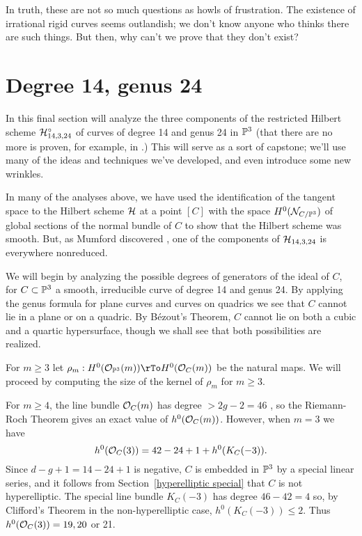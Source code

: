 In truth, these are not so much questions as howls of frustration. The existence of irrational rigid curves seems outlandish; we don't know anyone who thinks there are such things. But then, why can't we prove that they don't exist?



\section{Degree 14, genus 24}\label{mumford example}

In this final section will analyze the three components of the restricted Hilbert scheme $\cH^\circ_{14,3,24}$ of curves of degree 14 and genus 24 in $\PP^3$ (that there are no more is proven, for example, in \cite{Nasu2008}.) This will serve as a sort of capstone; we'll use many of the ideas and techniques we've developed, and even introduce some new wrinkles. 

In many of the analyses above, we have used the identification of the tangent space to the Hilbert scheme $\cH$ at a point $[C]$ with the space $H^0(\cN_{C/\PP^3})$ of global sections of the normal bundle of $C$ to show that the Hilbert scheme was smooth. But, as Mumford discovered \cite{Mumford1962}, one of the components of $\cH_{14,3,24}$  is everywhere nonreduced.

We will begin by analyzing the possible degrees of generators of the ideal of $C$, for $C \subset \PP^3$ a smooth, irreducible curve of degree 14 and genus 24. By applying the genus formula for plane curves and curves on quadrics we see that $C$ cannot lie in a plane or on a quadric. By B\'ezout's Theorem, $C$ cannot lie on both a cubic and a quartic hypersurface, though we shall see that both possibilities are realized.

For $m\geq 3$ let
$
\rho_m : H^0(\cO_{\PP^3}(m)) \rTo H^0(\cO_C(m))
$
be the natural maps.
We will proceed by computing the size of the kernel of $\rho_m$ for $m\geq 3$.

For $m \geq 4$, the line bundle $\cO_C(m)$ has degree $>2g-2 = 46$ , so the Riemann-Roch Theorem gives an exact value of $h^0(\cO_C(m))$.
However, when $m= 3$ we have 
$$
h^0(\cO_C(3)) = 42-24+1+h^0(K_C(-3)).
$$
Since $d-g+1 = 14-24+1$ is negative, $C$ is embedded in $\PP^3$ by a special linear series, and it follows from Section~\ref{hyperelliptic special} that $C$ is not hyperelliptic. The special line bundle $K_C(-3)$ has degree $46-42 = 4$ so,
by Clifford's Theorem in the non-hyperelliptic case, $h^0(K_C(-3)) \leq 2$. Thus $h^0(\cO_C(3)) = 19, 20$ or 21.

